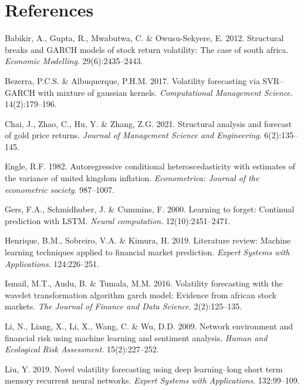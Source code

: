 \documentclass[11pt,preprint, authoryear]{elsarticle}
\numberwithin{equation}{section}
\numberwithin{figure}{section}
\numberwithin{table}{section}
\newlength{\cslhangindent}
\newenvironment{CSLReferences}%
  {\setlength{\parindent}{0pt}%
  \everypar{\setlength{\hangindent}{\cslhangindent}}\ignorespaces}%
  {\par}
\begin{document}
\hypertarget{references}{%
\section*{References}\label{references}}

\hypertarget{refs}{}
\begin{CSLReferences}{1}{0}
\leavevmode\hypertarget{ref-sa_garch}{}%
Babikir, A., Gupta, R., Mwabutwa, C. \& Owusu-Sekyere, E. 2012.
Structural breaks and GARCH models of stock return volatility: The case
of south africa. \emph{Economic Modelling}. 29(6):2435--2443.

\leavevmode\hypertarget{ref-svr-garch-2}{}%
Bezerra, P.C.S. \& Albuquerque, P.H.M. 2017. Volatility forecasting via
SVR--GARCH with mixture of gaussian kernels. \emph{Computational
Management Science}. 14(2):179--196.

\leavevmode\hypertarget{ref-sa-gold}{}%
Chai, J., Zhao, C., Hu, Y. \& Zhang, Z.G. 2021. Structural analysis and
forecast of gold price returns. \emph{Journal of Management Science and
Engineering}. 6(2):135--145.

\leavevmode\hypertarget{ref-engle}{}%
Engle, R.F. 1982. Autoregressive conditional heteroscedasticity with
estimates of the variance of united kingdom inflation.
\emph{Econometrica: Journal of the econometric society}. 987--1007.

\leavevmode\hypertarget{ref-lstm}{}%
Gers, F.A., Schmidhuber, J. \& Cummins, F. 2000. Learning to forget:
Continual prediction with LSTM. \emph{Neural computation}.
12(10):2451--2471.

\leavevmode\hypertarget{ref-lit_ml}{}%
Henrique, B.M., Sobreiro, V.A. \& Kimura, H. 2019. Literature review:
Machine learning techniques applied to financial market prediction.
\emph{Expert Systems with Applications}. 124:226--251.

\leavevmode\hypertarget{ref-sa-garch2}{}%
Ismail, M.T., Audu, B. \& Tumala, M.M. 2016. Volatility forecasting with
the wavelet transformation algorithm garch model: Evidence from african
stock markets. \emph{The Journal of Finance and Data Science}.
2(2):125--135.

\leavevmode\hypertarget{ref-li}{}%
Li, N., Liang, X., Li, X., Wang, C. \& Wu, D.D. 2009. Network
environment and financial risk using machine learning and sentiment
analysis. \emph{Human and Ecological Risk Assessment}. 15(2):227--252.

\leavevmode\hypertarget{ref-LIU}{}%
Liu, Y. 2019. Novel volatility forecasting using deep learning--long
short term memory recurrent neural networks. \emph{Expert Systems with
Applications}. 132:99--109.


\end{CSLReferences}
\end{document}
